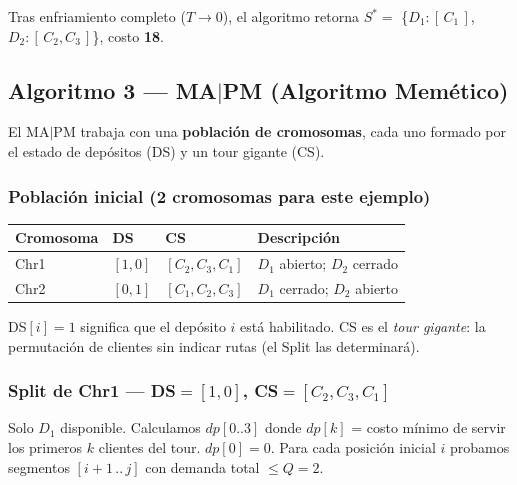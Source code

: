 \documentclass[12pt,a4paper]{article}
\begin{document}
Tras enfriamiento completo ($T \to 0$), el algoritmo retorna $S^* = $ \{$D_1:[\,C_1\,]$, $D_2:[\,C_2,C_3\,]$\}, costo \textbf{18}.

\subsection*{Algoritmo 3 — MA$|$PM (Algoritmo Memético)}

El MA$|$PM trabaja con una \textbf{población de cromosomas}, cada uno formado por el estado de depósitos (DS) y un tour gigante (CS).

\subsubsection*{Población inicial (2 cromosomas para este ejemplo)}

\begin{center}
\begin{tabular}{llll}
\toprule
Cromosoma & DS & CS & Descripción \\
\midrule
Chr1 & $[1,0]$ & $[C_2, C_3, C_1]$ & $D_1$ abierto; $D_2$ cerrado \\
Chr2 & $[0,1]$ & $[C_1, C_2, C_3]$ & $D_1$ cerrado; $D_2$ abierto \\
\bottomrule
\end{tabular}
\end{center}

DS$[i]=1$ significa que el depósito $i$ está habilitado.
CS es el \textit{tour gigante}: la permutación de clientes sin indicar rutas (el Split las determinará).

\subsubsection*{Split de Chr1 — DS$=[1,0]$, CS$=[C_2,C_3,C_1]$}

Solo $D_1$ disponible. Calculamos $dp[0..3]$ donde $dp[k]$ = costo mínimo de servir los primeros $k$ clientes del tour.
$dp[0]=0$. Para cada posición inicial $i$ probamos segmentos $[i{+}1\,{..}\,j]$ con demanda total $\leq Q=2$.
\end{document}
